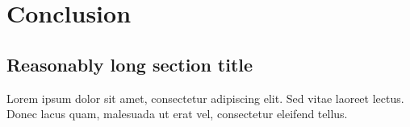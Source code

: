 
\chapter{Conclusion}

\ifpdf
    \graphicspath{{Chapter6/Figs/Raster/}{Chapter6/Figs/PDF/}{Chapter6/Figs/}}
\else
    \graphicspath{{Chapter6/Figs/Vector/}{Chapter6/Figs/}}
\fi


\section[Short title]{Reasonably long section title}

Lorem ipsum dolor sit amet, consectetur adipiscing elit. Sed vitae laoreet lectus.
Donec lacus quam, malesuada ut erat vel, consectetur eleifend tellus.
